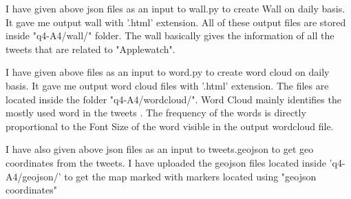 \documentclass[12pt]{Report}
\begin{document}
I have given above json files as an input to wall.py to create Wall on daily basis. It gave me output wall with '.html' extension. All of these output files are stored inside "q4-A4/wall/" folder. The wall basically gives the information of all the tweets that are related to "Applewatch".

I have given above files as an input to word.py to create word cloud on daily basis. It gave me output word cloud files with '.html' extension.
The files are located inside the folder "q4-A4/wordcloud/". Word Cloud mainly identifies the mostly used word in the tweets . The frequency of the words is directly proportional to the Font Size of the word visible in the output wordcloud file.

I have also given above json files as an input to tweets.geojson to get geo coordinates from the tweets.
 I have uploaded the geojson files located inside 'q4-A4/geojson/'  to get the map marked with markers located using "geojson coordinates"
\end{document}
